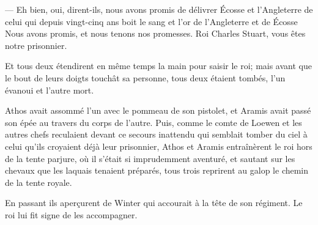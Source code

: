 — Eh bien, oui, dirent-ils, nous avons promis de délivrer Écosse et l'Angleterre de celui qui depuis vingt-cinq ans boit le sang et l'or de l'Angleterre et de Écosse Nous avons promis, et nous tenons nos promesses. Roi Charles Stuart, vous êtes notre prisonnier.

Et tous deux étendirent en même temps la main pour saisir le roi; mais avant que le bout de leurs doigts touchât sa personne, tous deux étaient tombés, l'un évanoui et l'autre mort.

Athos avait assommé l'un avec le pommeau de son pistolet, et Aramis avait passé son épée au travers du corps de l'autre.
Puis, comme le comte de Loewen et les autres chefs reculaient devant ce secours inattendu qui semblait tomber du ciel à celui qu'ils croyaient déjà leur prisonnier, Athos et Aramis entraînèrent le roi hors de la tente parjure, où il s'était si imprudemment aventuré, et sautant sur les chevaux que les laquais tenaient préparés, tous trois reprirent au galop le chemin de la tente royale.

En passant ils aperçurent de Winter qui accourait à la tête de son régiment. Le roi lui fit signe de les accompagner.